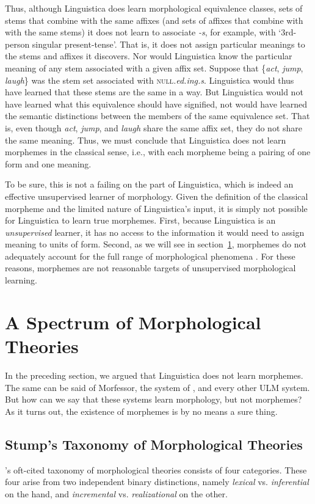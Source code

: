 Thus, although Linguistica does learn morphological equivalence classes, 
sets of stems that combine with the same affixes 
(and sets of affixes that combine with with the same stems) 
it does not learn to associate \textit{-s}, for example, 
with `3rd-person singular present-tense'. That is, it does not assign particular
meanings to the stems and affixes it discovers.
Nor would Linguistica know the particular meaning of any stem 
associated with a given affix set. 
Suppose that \{\textit{act}, \emph{jump}, \emph{laugh}\} 
was the stem set associated with \textsc{null}\textit{.ed.ing.s}. 
Linguistica would thus have learned that these stems are the same 
in a way. But Linguistica would not have learned what this 
equivalence should have signified, not would have learned the semantic 
distinctions between the members of the same equivalence set. 
That is, even though \textit{act}, \emph{jump}, and \emph{laugh} 
share the same affix set, they do not share the same meaning. 
Thus, we must conclude that Linguistica does not learn morphemes 
in the classical sense, i.e., with each morpheme being a
pairing of one form and one meaning.

To be sure, this is not a failing on the 
part of Linguistica, which is indeed an effective 
unsupervised learner of morphology. Given the definition 
of the classical morpheme and the limited nature of 
Linguistica's input, it is simply not possible for 
Linguistica to learn true morphemes. First, because 
Linguistica is an \emph{unsupervised} learner, it has 
no access to the information it would need to assign meaning to units of form.
Second, as we will see in section~\ref{sec:morpho-theories}, morphemes do not adequately 
account for the full range of morphological phenomena \citep{anderson:2017}. 
For these reasons, morphemes are not reasonable 
targets of unsupervised morphological learning.

\section{A Spectrum of Morphological Theories}
\label{sec:morpho-theories}
In the preceding section, we argued that Linguistica does not learn morphemes. The same can be said of Morfessor, 
the system of \cite{poon-et-al:2009}, and
every other ULM  system.
 But how can we say that these systems learn morphology, but not morphemes? As it turns out,
 the existence of morphemes is by no means a sure thing.  

\subsection{Stump's Taxonomy of Morphological Theories}
\cite{stump:2001}'s oft-cited taxonomy of morphological theories 
consists of four categories. These four arise from two independent 
binary distinctions, namely \emph{lexical} vs. \emph{inferential} on the hand, and \emph{incremental} vs. \emph{realizational} on the other.
 
